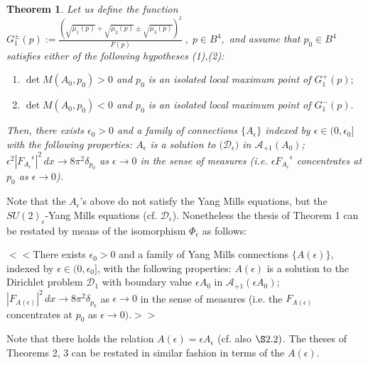 \documentclass[11pt]{article}
\numberwithin{equation}{section} \setlength{\topmargin}{-35pt}
\begin{document}
\newtheorem{theorem}{Theorem}%
\begin{theorem} Let us define the function $G_1^\pm (p):=\frac{(\sqrt{\mu_1(p)}+ \sqrt{\mu_2(p)}\pm\sqrt{\mu_3(p)})^2}{F(p)}\;,\; p\in B^4,$
and assume that $p_0\in B^4$ satisfies either of the following
hypotheses (1),(2):
\begin{enumerate}[(1)]
\item $\det M(A_0,p_0)>0$  and $p_0$ is an isolated local maximum point of $G_1^+(p);$
\item $\det M(A_0,p_0)<0$ and $p_0$ is an isolated local maximum point of $G_1^-(p).$
\end{enumerate}
Then, there exists $\epsilon_0>0$ and  a family of connections
$\{{A}_\epsilon\}$ indexed by $\epsilon\in (0, \epsilon_0]$ with the
following properties: ${A}_{\epsilon}$ is a solution to
$\bigl(\mathcal{D}_{\epsilon}\bigr)$ in $\mathcal{A}_{+1}(A_0)$;
$\epsilon^2|{F_{{A}_{\epsilon}}}^{\epsilon}|^2\,dx\to
8\pi^2\delta_{p_0}$ as $\epsilon\to 0$ in the sense of measures
(i.e. $\epsilon {F_{{A}_{\epsilon}}}^{\epsilon}$ concentrates at
$p_0$ as $\epsilon\to 0$).
%
\end{theorem}
\begin{remark}
Note that the ${{A}_{\epsilon}}$'s above do not satisfy the
Yang Mills equations, but the $SU(2)_\epsilon$-Yang Mills equations
(cf. $\mathcal D_\epsilon$). Nonetheless the thesis of Theorem 1 can
be restated by means of the isomorphism $\Phi_\epsilon$ as follows:

\noindent $<<$There exists $\epsilon_0>0$ and a family of Yang Mills
connections  $\{{A}(\epsilon)\}$, indexed by $\epsilon\in (0,
\epsilon_0]$, with the following properties:
 ${A}(\epsilon)$ is a solution to the Dirichlet problem $\mathcal D_1$ with boundary value $\epsilon A_0$ in
$\mathcal{A}_{+1}(\epsilon A_0)$;
$|F_{{A}(\epsilon)}|^2\,dx\to 8\pi^2\delta_{p_0}$ as
$\epsilon\to 0$ in the sense of measures (i.e. the
$F_{{A}(\epsilon)}$ concentrates at $p_0$ as $\epsilon\to
0)$.$>>$

\noindent Note that there holds the relation
${A}(\epsilon)= \epsilon {A}_\epsilon$ (cf. also
$\S2.2)$. The theses of Theorems 2, 3 can be restated in similar
fashion in terms of the ${A}(\epsilon)$.
\end{remark}
\end{document}

